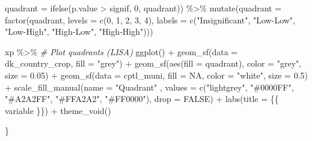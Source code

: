 \documentclass[
  12pt,
]{article}
\newenvironment{Shaded}{\begin{snugshade}}{\end{snugshade}}
\newcommand{\AttributeTok}[1]{\textcolor[rgb]{0.77,0.63,0.00}{#1}}
\newcommand{\CommentTok}[1]{\textcolor[rgb]{0.56,0.35,0.01}{\textit{#1}}}
\newcommand{\ConstantTok}[1]{\textcolor[rgb]{0.00,0.00,0.00}{#1}}
\newcommand{\DecValTok}[1]{\textcolor[rgb]{0.00,0.00,0.81}{#1}}
\newcommand{\FloatTok}[1]{\textcolor[rgb]{0.00,0.00,0.81}{#1}}
\newcommand{\FunctionTok}[1]{\textcolor[rgb]{0.00,0.00,0.00}{#1}}
\newcommand{\NormalTok}[1]{#1}
\newcommand{\SpecialCharTok}[1]{\textcolor[rgb]{0.00,0.00,0.00}{#1}}
\newcommand{\StringTok}[1]{\textcolor[rgb]{0.31,0.60,0.02}{#1}}
\begin{document}
\begin{Shaded}
\begin{Highlighting}[]
           \AttributeTok{quadrant =} \FunctionTok{ifelse}\NormalTok{(p.value }\SpecialCharTok{\textgreater{}}\NormalTok{ signif, }\DecValTok{0}\NormalTok{, quadrant)) }\SpecialCharTok{\%\textgreater{}\%} 
    \FunctionTok{mutate}\NormalTok{(}\AttributeTok{quadrant =} \FunctionTok{factor}\NormalTok{(quadrant,}
                             \AttributeTok{levels =} \FunctionTok{c}\NormalTok{(}\DecValTok{0}\NormalTok{, }\DecValTok{1}\NormalTok{, }\DecValTok{2}\NormalTok{, }\DecValTok{3}\NormalTok{, }\DecValTok{4}\NormalTok{), }
                             \AttributeTok{labels =}  \FunctionTok{c}\NormalTok{(}\StringTok{"Insignificant"}\NormalTok{,}
                                         \StringTok{"Low{-}Low"}\NormalTok{,}
                                         \StringTok{"Low{-}High"}\NormalTok{,}
                                         \StringTok{"High{-}Low"}\NormalTok{,}
                                         \StringTok{"High{-}High"}\NormalTok{))) }
  
\NormalTok{  xp }\SpecialCharTok{\%\textgreater{}\%} 
    \CommentTok{\# Plot quadrants (LISA)}
    \FunctionTok{ggplot}\NormalTok{() }\SpecialCharTok{+}
    \FunctionTok{geom\_sf}\NormalTok{(}\AttributeTok{data =}\NormalTok{ dk\_country\_crop, }\AttributeTok{fill =} \StringTok{"grey"}\NormalTok{) }\SpecialCharTok{+}
    \FunctionTok{geom\_sf}\NormalTok{(}\FunctionTok{aes}\NormalTok{(}\AttributeTok{fill =}\NormalTok{ quadrant), }\AttributeTok{color =} \StringTok{"grey"}\NormalTok{, }\AttributeTok{size =} \FloatTok{0.05}\NormalTok{) }\SpecialCharTok{+}
    \FunctionTok{geom\_sf}\NormalTok{(}\AttributeTok{data =}\NormalTok{ cptl\_muni, }\AttributeTok{fill =} \ConstantTok{NA}\NormalTok{, }\AttributeTok{color =} \StringTok{"white"}\NormalTok{, }\AttributeTok{size =} \FloatTok{0.5}\NormalTok{) }\SpecialCharTok{+} 
    \FunctionTok{scale\_fill\_manual}\NormalTok{(}\AttributeTok{name =} \StringTok{"Quadrant"}\NormalTok{ ,}
                      \AttributeTok{values =} \FunctionTok{c}\NormalTok{(}\StringTok{"lightgrey"}\NormalTok{,}
                                 \StringTok{"\#0000FF"}\NormalTok{,}
                                 \StringTok{"\#A2A2FF"}\NormalTok{,}
                                 \StringTok{"\#FFA2A2"}\NormalTok{,}
                                 \StringTok{"\#FF0000"}\NormalTok{),}
                      \AttributeTok{drop =} \ConstantTok{FALSE}\NormalTok{) }\SpecialCharTok{+}
    \FunctionTok{labs}\NormalTok{(}\AttributeTok{title =}\NormalTok{ \{\{ variable \}\}) }\SpecialCharTok{+}
    \FunctionTok{theme\_void}\NormalTok{()}
  
\NormalTok{\}}
\end{Highlighting}
\end{Shaded}
\end{document}
